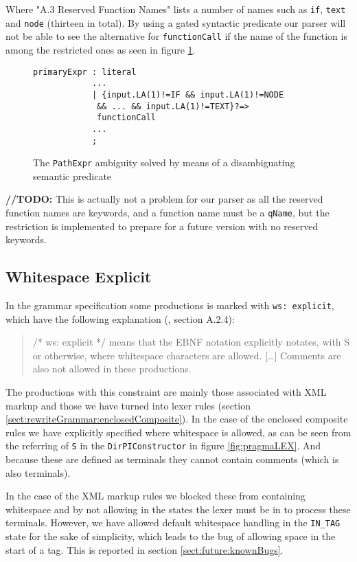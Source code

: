 Where "A.3 Reserved Function Names" lists a number of names such as \verb!if!, \verb!text! and \verb!node! (thirteen in total). By using a gated syntactic predicate our parser will not be able to see the alternative for \verb!functionCall! if the name of the function is among the restricted ones as seen in figure \ref{fig:reservedFunction}.

\begin{figure}[h!]
\begin{verbatim}
primaryExpr : literal 
            ...
            | {input.LA(1)!=IF && input.LA(1)!=NODE
             && ... && input.LA(1)!=TEXT}?=>
             functionCall 
            ...
            ;
\end{verbatim}
\caption[The \texttt{PathExpr} ambiguity solved]{The \texttt{PathExpr} ambiguity solved by means of a disambiguating semantic predicate}
\label{fig:reservedFunction}
\end{figure}

\textbf{\LARGE //TODO:} This is actually not a problem for our parser as all the reserved function names are keywords, and a function name must be a \verb!qName!, but the restriction is implemented to prepare for a future version with no reserved keywords.

\subsection{Whitespace Explicit}
In the grammar specification some productions is marked with \verb!ws: explicit!, which have the following explanation (\cite{w3c00}, section A.2.4):
\begin{quote}
/* ws: explicit */ means that the EBNF notation explicitly notates, with S or otherwise, where whitespace characters are allowed. [\ldots] Comments are also not allowed in these productions.
\end{quote} 

The productions with this constraint are mainly those associated with XML markup and those we have turned into lexer rules (section \ref{sect:rewriteGrammar:enclosedComposite}). In the case of the enclosed composite rules we have explicitly specified where whitespace is allowed, as can be seen from the referring of \verb!S! in the \verb!DirPIConstructor! in figure \ref{fig:pragmaLEX}. And because these are defined as terminals they cannot contain comments (which is also terminals).

In the case of the XML markup rules we blocked these from containing whitespace and by not allowing in the states the lexer must be in to process these terminals. However, we have allowed default whitespace handling in the \verb!IN_TAG! state for the sake of simplicity, which leads to the bug of allowing space in the start of a tag. This is reported in section \ref{sect:future:knownBugs}.

